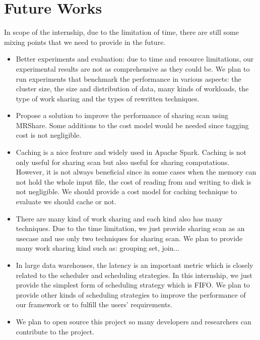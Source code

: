 \section{Future Works}
In scope of the internship, due to the limitation of time, there are still some mixing points that we need to provide in the future.
\begin{itemize}

\item Better experiments and evaluation: due to time and resource limitations, our experimental results are not as comprehensive as they could be. We plan to run experiments that benchmark the performance in various aspects: the cluster size, the size and distribution of data, many kinds of workloads, the type of work sharing and the types of rewritten techniques.

\item Propose a solution to improve the performance of sharing scan using MRShare. Some additions to the cost model would be needed since tagging cost is not negligible.

\item Caching is a nice feature and widely used in Apache Spark. Caching is not only useful for sharing scan but also useful for sharing computations. However, it is not always beneficial since in some cases when the memory can not hold the whole input file, the cost of reading from and writing to disk is not negligible. We should provide a cost model for caching technique to evaluate we should cache or not.

\item There are many kind of work sharing and each kind also has many techniques. Due to the time limitation, we just provide sharing scan as an usecase and use only two techniques for sharing scan. We plan to provide many work sharing kind such as: grouping set, join...

\item In large data warehouses, the latency is an important metric which is closely related to the scheduler and scheduling strategies. In this internship, we just provide the simplest form of scheduling strategy which is FIFO. We plan to provide other kinds of scheduling strategies to improve the performance of our framework or to fulfill the users' requirements.

\item We plan to open source this project so many developers and researchers can contribute to the project.
\end{itemize}
